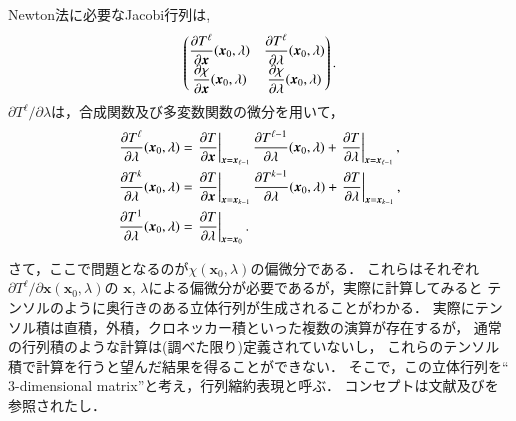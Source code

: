 \documentclass[a4paper,dvipdfmx]{jsarticle}
\newcommand{\pdiff}[3]{
 \ifnum #1<1
 \text{Args[0] should be more than 1} \else{
 \ifnum #1=1 \displaystyle \frac{\partial #2}{\partial #3}\else
 \displaystyle \frac{\partial^{#1} #2}{\partial #3^{#1}}\fi
 }\fi
}
\begin{document}
Newton法に必要なJacobi行列は,
\begin{align}
    \begin{pmatrix}
        \pdiff{1}{T^\ell}{\bm{x}}(\bm{x}_0, \lambda) &
        \pdiff{1}{T^\ell}{\lambda}(\bm{x}_0, \lambda) \\
        \pdiff{1}{\chi}{\bm{x}}(\bm{x}_0, \lambda) &
        \pdiff{1}{\chi}{\lambda}(\bm{x}_0, \lambda)
    \end{pmatrix}.
\end{align}
$\partial T^\ell/\partial \lambda$は，合成関数及び多変数関数の微分を用いて，
\begin{align}
    \begin{split}    
    \pdiff{1}{T^\ell}{\lambda}(\bm{x}_0, \lambda) &=
        \left.\pdiff{1}{T}{\bm{x}}\right|_{\bm{x}=\bm{x}_{\ell-1}}
        \pdiff{1}{T^{\ell-1}}{\lambda}(\bm{x}_0, \lambda)
        + \left.\pdiff{1}{T}{\lambda}\right|_{\bm{x}=\bm{x}_{\ell-1}},\\
    \pdiff{1}{T^k}{\lambda}(\bm{x}_0, \lambda) &=
        \left.\pdiff{1}{T}{\bm{x}}\right|_{\bm{x}=\bm{x}_{k-1}}
        \pdiff{1}{T^{k-1}}{\lambda}(\bm{x}_0, \lambda)
        + \left.\pdiff{1}{T}{\lambda}\right|_{\bm{x}=\bm{x}_{k-1}},\\
    \pdiff{1}{T^1}{\lambda}(\bm{x}_0, \lambda) &=
        \left.\pdiff{1}{T}{\lambda}\right|_{\bm{x}=\bm{x}_0}.
    \end{split}
    \label{eq:dTldlambda}
\end{align}

さて，ここで問題となるのが$\chi(\bm{x}_0, \lambda)$の偏微分である．
これらはそれぞれ$\partial T^\ell/\partial \bm{x}(\bm{x}_0, \lambda)$の
$\bm{x}$, $\lambda$による偏微分が必要であるが，実際に計算してみると
テンソルのように奥行きのある立体行列が生成されることがわかる．
実際にテンソル積は直積，外積，クロネッカー積といった複数の演算が存在するが，
通常の行列積のような計算は(調べた限り)定義されていないし，
これらのテンソル積で計算を行うと望んだ結果を得ることができない．
そこで，この立体行列を``$3$-dimensional matrix''と考え，行列縮約表現と呼ぶ．
コンセプトは文献\cite{multidim}及び\cite{3d}を参照されたし．
\end{document}
